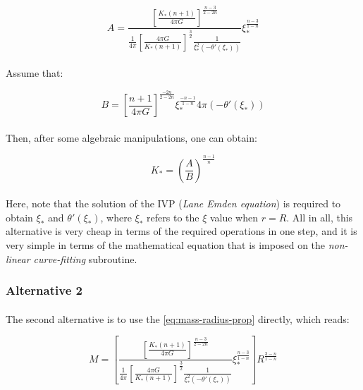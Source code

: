 \documentclass[letterpaper,12pt]{article}
\begin{document}
\begin{equation*}
   A =\frac{ \left[\frac{K_* \left(n+1\right)}{4 \pi G}\right]^{\frac{n-3}{2 - 2n}} }{\frac{1}{4 \pi} \left[\frac{4 \pi G}{K_* \left(n+1\right)}\right]^{\frac{3}{2}}  \frac{1}{\xi_*^2\left(-\theta'(\xi_*)\right)}} \xi_*^{\frac{n-3}{1-n}}
\end{equation*}

\paragraph{}Assume that:

\begin{equation*}
    B = \left[\frac{n+1}{4\pi G}\right]^{\frac{-2n}{2-2n}} \xi_*^{\frac{-n-1}{1-n}} 4 \pi \left( -\theta'(\xi_*) \right)
\end{equation*}

\paragraph{} Then, after some algebraic manipulations, one can obtain:

\begin{equation*}
    K_* = \left(\frac{A}{B}\right) ^ {\frac{n-1}{n}}
\end{equation*}

\paragraph{} Here, note that the solution of the IVP (\textit{Lane Emden equation}) is required to obtain $\xi_*$ and $\theta'(\xi_*)$, where $\xi_*$ refers to the $\xi$ value when $r = R$. All in all, this alternative is very cheap in terms of the required operations in one step, and it is very simple in terms of the mathematical equation that is imposed on the \textit{non-linear curve-fitting} subroutine.

\subsubsection{Alternative 2}

\paragraph{} The second alternative is to use the \eqref{eq:mass-radius-prop} directly, which reads:

\begin{equation}
    \label{eq:M-R-long}
    M = \left[\frac{ \left[\frac{K_* \left(n+1\right)}{4 \pi G}\right]^{\frac{n-3}{2 - 2n}} }{\frac{1}{4 \pi} \left[\frac{4 \pi G}{K_* \left(n+1\right)}\right]^{\frac{3}{2}}  \frac{1}{\xi_*^2\left(-\theta'(\xi_*)\right)}} \xi_*^{\frac{n-3}{1-n}} \right] R^{\frac{3-n}{1-n}}
\end{equation}
\end{document}
